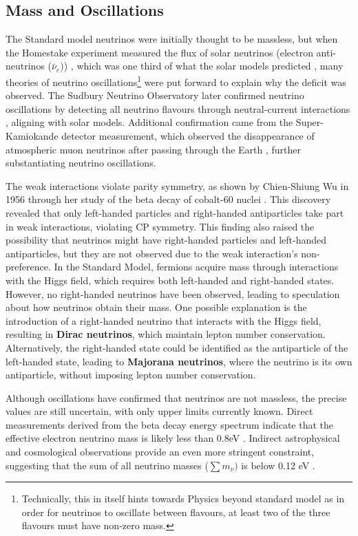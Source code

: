 \subsection{Mass and Oscillations}
\label{sec:nu_mass_osc}
The Standard model neutrinos were initially thought to be massless, but when the Homestake experiment measured the flux of solar neutrinos (electron anti-neutrinos ($\bar{\nu}_e$)) , which was one third of what the solar models predicted , many theories of neutrino oscillations\footnote{Technically, this in itself hints towards Physics beyond standard model as in order for neutrinos to oscillate between flavours, at least two of the three flavours must have non-zero mass.} were put forward to explain why the deficit was observed. The Sudbury Neutrino Observatory later confirmed neutrino oscillations by detecting all neutrino flavours through neutral-current interactions , aligning with solar models. Additional confirmation came from the Super-Kamiokande detector measurement, which observed the disappearance of atmospheric muon neutrinos after passing through the Earth , further substantiating neutrino oscillations. 

The weak interactions violate parity symmetry, as shown by Chien-Shiung Wu in 1956 through her study of the beta decay of cobalt-60 nuclei . This discovery revealed that only left-handed particles and right-handed antiparticles take part in weak interactions, violating CP symmetry. This finding also raised the possibility that neutrinos might have right-handed particles and left-handed antiparticles, but they are not observed due to the weak interaction's non-preference. In the Standard Model, fermions acquire mass through interactions with the Higgs field, which requires both left-handed and right-handed states. However, no right-handed neutrinos have been observed, leading to speculation about how neutrinos obtain their mass. One possible explanation is the introduction of a right-handed neutrino that interacts with the Higgs field, resulting in \textbf{Dirac neutrinos}, which maintain lepton number conservation. Alternatively, the right-handed state could be identified as the antiparticle of the left-handed state, leading to \textbf{Majorana neutrinos}, where the neutrino is its own antiparticle, without imposing lepton number conservation.

Although oscillations have confirmed that neutrinos are not massless, the precise values are still uncertain, with only upper limits currently known. Direct measurements derived from the beta decay energy spectrum indicate that the effective electron neutrino mass is likely less than 0.8eV . Indirect astrophysical and cosmological observations provide an even more stringent constraint, suggesting that the sum of all neutrino masses ($\sum{{m}_{\nu}})$ is below 0.12 eV . 

